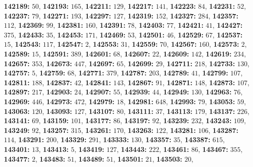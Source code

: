 \textsf{\bfseries 142189:} $50$, \textsf{\bfseries 142193:} $165$, \textsf{\bfseries 142211:} $129$, \textsf{\bfseries 142217:} $141$, \textsf{\bfseries 142223:} $84$, \textsf{\bfseries 142231:} $52$, \textsf{\bfseries 142237:} $79$, \textsf{\bfseries 142271:} $193$, \textsf{\bfseries 142297:} $127$, \textsf{\bfseries 142319:} $152$, \textsf{\bfseries 142327:} $284$, \textsf{\bfseries 142357:} $112$, \textsf{\bfseries 142369:} $99$, \textsf{\bfseries 142381:} $160$, \textsf{\bfseries 142391:} $78$, \textsf{\bfseries 142403:} $77$, \textsf{\bfseries 142421:} $41$, \textsf{\bfseries 142427:} $375$, \textsf{\bfseries 142433:} $35$, \textsf{\bfseries 142453:} $171$, \textsf{\bfseries 142469:} $53$, \textsf{\bfseries 142501:} $46$, \textsf{\bfseries 142529:} $67$, \textsf{\bfseries 142537:} $15$, \textsf{\bfseries 142543:} $117$, \textsf{\bfseries 142547:} $2$, \textsf{\bfseries 142553:} $31$, \textsf{\bfseries 142559:} $70$, \textsf{\bfseries 142567:} $160$, \textsf{\bfseries 142573:} $2$, \textsf{\bfseries 142589:} $15$, \textsf{\bfseries 142591:} $389$, \textsf{\bfseries 142601:} $68$, \textsf{\bfseries 142607:} $22$, \textsf{\bfseries 142609:} $142$, \textsf{\bfseries 142619:} $234$, \textsf{\bfseries 142657:} $353$, \textsf{\bfseries 142673:} $447$, \textsf{\bfseries 142697:} $65$, \textsf{\bfseries 142699:} $29$, \textsf{\bfseries 142711:} $218$, \textsf{\bfseries 142733:} $130$, \textsf{\bfseries 142757:} $5$, \textsf{\bfseries 142759:} $68$, \textsf{\bfseries 142771:} $379$, \textsf{\bfseries 142787:} $203$, \textsf{\bfseries 142789:} $41$, \textsf{\bfseries 142799:} $107$, \textsf{\bfseries 142811:} $188$, \textsf{\bfseries 142837:} $42$, \textsf{\bfseries 142841:} $143$, \textsf{\bfseries 142867:} $91$, \textsf{\bfseries 142871:} $148$, \textsf{\bfseries 142873:} $107$, \textsf{\bfseries 142897:} $217$, \textsf{\bfseries 142903:} $24$, \textsf{\bfseries 142907:} $55$, \textsf{\bfseries 142939:} $44$, \textsf{\bfseries 142949:} $130$, \textsf{\bfseries 142963:} $76$, \textsf{\bfseries 142969:} $446$, \textsf{\bfseries 142973:} $472$, \textsf{\bfseries 142979:} $18$, \textsf{\bfseries 142981:} $648$, \textsf{\bfseries 142993:} $79$, \textsf{\bfseries 143053:} $59$, \textsf{\bfseries 143063:} $120$, \textsf{\bfseries 143093:} $127$, \textsf{\bfseries 143107:} $80$, \textsf{\bfseries 143111:} $37$, \textsf{\bfseries 143113:} $179$, \textsf{\bfseries 143137:} $226$, \textsf{\bfseries 143141:} $69$, \textsf{\bfseries 143159:} $101$, \textsf{\bfseries 143177:} $86$, \textsf{\bfseries 143197:} $92$, \textsf{\bfseries 143239:} $232$, \textsf{\bfseries 143243:} $109$, \textsf{\bfseries 143249:} $92$, \textsf{\bfseries 143257:} $315$, \textsf{\bfseries 143261:} $170$, \textsf{\bfseries 143263:} $122$, \textsf{\bfseries 143281:} $106$, \textsf{\bfseries 143287:} $114$, \textsf{\bfseries 143291:} $200$, \textsf{\bfseries 143329:} $291$, \textsf{\bfseries 143333:} $130$, \textsf{\bfseries 143357:} $35$, \textsf{\bfseries 143387:} $615$, \textsf{\bfseries 143401:} $13$, \textsf{\bfseries 143413:} $5$, \textsf{\bfseries 143419:} $127$, \textsf{\bfseries 143443:} $222$, \textsf{\bfseries 143461:} $86$, \textsf{\bfseries 143467:} $355$, \textsf{\bfseries 143477:} $2$, \textsf{\bfseries 143483:} $51$, \textsf{\bfseries 143489:} $51$, \textsf{\bfseries 143501:} $21$, \textsf{\bfseries 143503:} $20$, 
